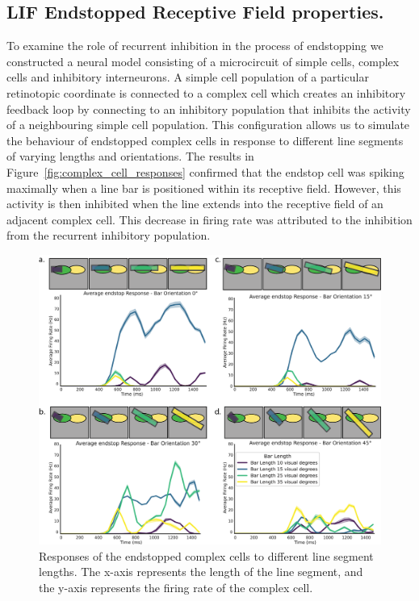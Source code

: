 \documentclass[12pt]{article}
\begin{document}
\subsection{LIF Endstopped Receptive Field properties.}
To examine the role of recurrent inhibition in the process of endstopping we constructed a neural model consisting of a microcircuit of simple cells, complex cells and inhibitory interneurons. A simple cell population of a particular retinotopic coordinate is connected to a complex cell which creates an inhibitory feedback loop by connecting to an inhibitory population that inhibits the activity of a neighbouring simple cell population. This configuration allows us to simulate the behaviour of endstopped complex cells in response to different line segments of varying lengths and orientations. The results in Figure~\ref{fig:complex_cell_responses} confirmed that the endstop cell was spiking maximally when a line bar is positioned within its receptive field. However, this activity is then inhibited when the line extends into the receptive field of an adjacent complex cell. This decrease in firing rate was attributed to the inhibition from the recurrent inhibitory population. 

\begin{figure}[H]
    \centering
    \includegraphics[width=1 \textwidth]{./figures/LIF_endstopping_length_orientation.png}
    \caption{Responses of the endstopped complex cells to different line segment lengths. The x-axis represents the length of the line segment, and the y-axis represents the firing rate of the complex cell.}
    \label{fig:endstopping}
\end{figure}
\end{document}
